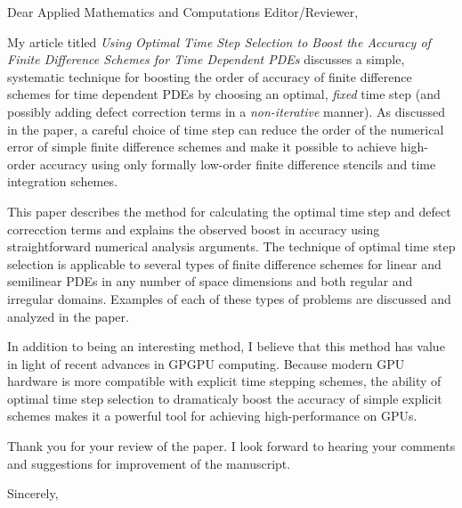 \documentclass[12pt]{letter}
\begin{document}
\address{}
\signature{Kevin T. Chu}

\begin{letter}
{
}

\opening{Dear Applied Mathematics and Computations Editor/Reviewer,}

My article titled \emph{Using Optimal Time Step Selection to Boost the
Accuracy of Finite Difference Schemes for Time Dependent PDEs} discusses a 
simple, systematic technique for boosting the order of accuracy of finite
difference schemes for time dependent PDEs by choosing an optimal, 
\emph{fixed} time step (and possibly adding defect correction terms in a 
\emph{non-iterative} manner).  As discussed in the paper, a careful choice of
time step can reduce the order of the numerical error of simple finite 
difference schemes and make it possible to achieve high-order accuracy using 
only formally low-order finite difference stencils and time integration 
schemes.  

This paper describes the method for calculating the optimal time step and
defect correcction terms and explains the observed boost in accuracy using 
straightforward numerical analysis arguments.  The technique of optimal time 
step selection is applicable to several types of finite difference schemes
for linear and semilinear PDEs in any number of space dimensions and both 
regular and irregular domains.  Examples of each of these types of problems 
are discussed and analyzed in the paper.

In addition to being an interesting method, I believe that this method has
value in light of recent advances in GPGPU computing.  Because modern GPU
hardware is more compatible with explicit time stepping schemes, the ability
of optimal time step selection to dramaticaly boost the accuracy of simple
explicit schemes makes it a powerful tool for achieving high-performance
on GPUs.

Thank you for your review of the paper.  I look forward to hearing your 
comments and suggestions for improvement of the manuscript.

\closing{Sincerely,}

\end{letter}
\end{document}
